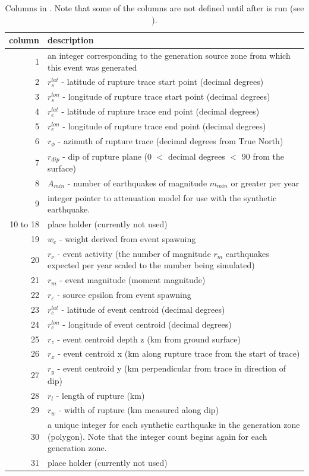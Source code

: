\begin{table}
\centering \caption{Columns in . Note
that some of the columns are not defined until after
 is run (see
).}
 \label{tab:evntdb-columns}
\vspace{0.8em}
\begin{tabular}{r|p{}}
\hline
column & description \\
\hline
1 & an integer corresponding to the generation source zone from which this event was generated \\
2 & $r_s^{lat}$ - latitude of rupture trace start point (decimal degrees)\\
3 & $r_s^{lon}$ - longitude of rupture trace start point (decimal degrees)\\
4 & $r_e^{lat}$ - latitude of rupture trace end point (decimal degrees)\\
5 & $r_e^{lon}$ - longitude of rupture trace end point (decimal degrees)\\
6 & $r_\phi$ - azimuth of rupture trace (decimal degrees from True North)\\
7 & $r_{dip}$ - dip of rupture plane (0 $<$ decimal degrees $<$ 90 from the surface) \\
8 & $A_{min}$ - number of earthquakes of magnitude $m_{min}$ or greater per year\\
9 & integer pointer to attenuation model for use with the synthetic earthquake.\\
10 to 18 & place holder (currently not used) \\
19 & $w_e$ - weight derived from event spawning  \\
20 & $r_\nu$ - event activity (the number of magnitude $r_m$ earthquakes expected per year scaled to the number being simulated) \\
21 & $r_m$ - event magnitude (moment magnitude)\\
22 & $r_\varepsilon$ - source epsilon from event spawning\\
23 & $r_c^{lat}$ - latitude of event centroid (decimal degrees) \\
24 & $r_c^{lon}$ - longitude of event centroid (decimal degrees) \\
25 & $r_z$ - event centroid depth z (km from ground surface) \\
26 & $r_x$ - event centroid x (km along rupture trace from the
start of trace) \\
27 & $r_y$ - event centroid y (km perpendicular from trace in
direction of
dip) \\
28 & $r_l$ - length of rupture (km) \\
29 & $r_w$ - width of rupture (km measured along dip) \\
30 & a unique integer for each synthetic earthquake in the generation zone (polygon). Note that the integer count begins again for each generation zone. \\
31 & place holder (currently not used) \\
\hline
\end{tabular}
\end{table}


